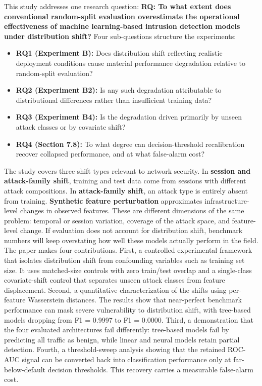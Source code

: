 \documentclass[10pt]{article}
\begin{document}
This study addresses one research question:
\textbf{RQ: To what extent does conventional random-split evaluation overestimate the operational effectiveness of machine learning-based intrusion detection models under distribution shift?}
Four sub-questions structure the experiments:
\begin{itemize}
\item \textbf{RQ1 (Experiment B):} Does distribution shift reflecting realistic deployment conditions cause material performance degradation relative to random-split evaluation?
\item \textbf{RQ2 (Experiment B2):} Is any such degradation attributable to distributional differences rather than insufficient training data?
\item \textbf{RQ3 (Experiment B4):} Is the degradation driven primarily by unseen attack classes or by covariate shift?
\item \textbf{RQ4 (Section 7.8):} To what degree can decision-threshold recalibration recover collapsed performance, and at what false-alarm cost?
\end{itemize}
The study covers three shift types relevant to network security. In \textbf{session and attack-family shift}, training and test data come from sessions with different attack compositions. In \textbf{attack-family shift}, an attack type is entirely absent from training. \textbf{Synthetic feature perturbation} approximates infrastructure-level changes in observed features. These are different dimensions of the same problem: temporal or session variation, coverage of the attack space, and feature-level change.
If evaluation does not account for distribution shift, benchmark numbers will keep overstating how well these models actually perform in the field.
The paper makes four contributions. First, a controlled experimental framework that isolates distribution shift from confounding variables such as training set size. It uses matched-size controls with zero train/test overlap and a single-class covariate-shift control that separates unseen attack classes from feature displacement. Second, a quantitative characterization of the shifts using per-feature Wasserstein distances. The results show that near-perfect benchmark performance can mask severe vulnerability to distribution shift, with tree-based models dropping from F1 = 0.9997 to F1 = 0.0000. Third, a demonstration that the four evaluated architectures fail differently: tree-based models fail by predicting all traffic as benign, while linear and neural models retain partial detection. Fourth, a threshold-sweep analysis showing that the retained ROC-AUC signal can be converted back into classification performance only at far-below-default decision thresholds. This recovery carries a measurable false-alarm cost.
\end{document}
